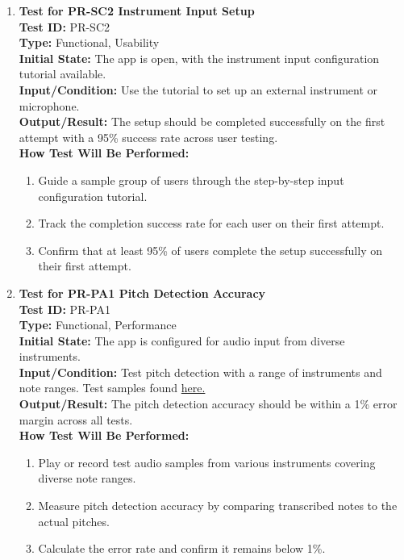 \documentclass[12pt, titlepage]{article}
\begin{document}
\begin{enumerate}
    \item \textbf{Test for PR-SC2 Instrument Input Setup} \\
      \newline
      \textbf{Test ID:} PR-SC2 \\
      \textbf{Type:} Functional, Usability \\
      \textbf{Initial State:} The app is open, with the instrument input configuration tutorial available. \\
      \textbf{Input/Condition:} Use the tutorial to set up an external instrument or microphone. \\
      \textbf{Output/Result:} The setup should be completed successfully on the first attempt with a 95\% success rate across user testing. \\
      \textbf{How Test Will Be Performed:}
      \begin{enumerate}
          \item Guide a sample group of users through the step-by-step input configuration tutorial.
          \item Track the completion success rate for each user on their first attempt.
          \item Confirm that at least 95\% of users complete the setup successfully on their first attempt.
      \end{enumerate}

    \item \textbf{Test for PR-PA1 Pitch Detection Accuracy} \\
      \newline
      \textbf{Test ID:} PR-PA1 \\
      \textbf{Type:} Functional, Performance \\
      \textbf{Initial State:} The app is configured for audio input from diverse instruments. \\
      \textbf{Input/Condition:} Test pitch detection with a range of instruments and note ranges. Test samples found \href{https://github.com/JaakLipp/ScoreGen/tree/main/test/TestingDatasets}{here.}\\
      \textbf{Output/Result:} The pitch detection accuracy should be within a 1\% error margin across all tests. \\
      \textbf{How Test Will Be Performed:}
      \begin{enumerate}
          \item Play or record test audio samples from various instruments covering diverse note ranges.
          \item Measure pitch detection accuracy by comparing transcribed notes to the actual pitches.
          \item Calculate the error rate and confirm it remains below 1\%.
      \end{enumerate}


\end{enumerate}
\end{document}
